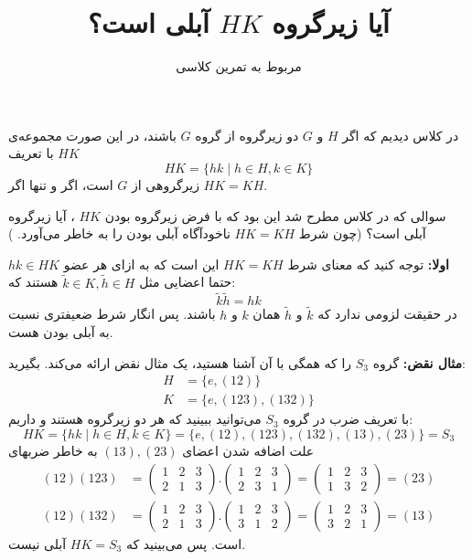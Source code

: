 \documentclass[a4paper, 12pt]{article}
\title{\textbf{
آیا زیرگروه $HK$ آبلی است؟
}}
\author{مربوط به تمرین کلاسی}
\date{}
\begin{document}
\maketitle
در کلاس دیدیم که اگر 
$H$ و $G$ 
دو زیرگروه از گروه $G$ باشند، در این صورت مجموعه‌ی 
$HK$
با تعریف 
\[
HK = \{hk \;\big|\; h\in H , k\in K\}
\]
زیرگروهی از $G$ است، اگر و تنها اگر $HK = KH$.

سوالی که در کلاس مطرح شد این بود که با فرض زیرگروه بودن 
$HK$
‌، آیا زیرگروه آبلی است؟ (چون شرط 
$HK=KH$
ناخودآگاه آبلی بودن را به خاطر می‌آورد.
)

\vspace{1.5em}
\textbf{اولا:}
توجه کنید که معنای شرط 
$HK=KH$
این است که به ازای هر عضو 
$hk \in HK$
حتما اعضایی مثل 
$\tilde{k} \in K , \tilde{h}\in H$
هستند که:
\[
\tilde{k}\tilde{h} = hk
\]
‌‌در حقیقت لزومی ندارد که 
$\tilde{k}$
و 
$\tilde{h}$
همان 
$k$ و $h$ 
باشند. پس انگار شرط ضعیفتری نسبت به آبلی بودن هست.

\vspace{1.5 em}
\textbf{مثال نقض:}
گروه 
$S_3$
را که همگی با آن آشنا هستید، یک مثال نقض ارائه می‌کند. بگیرید:
\begin{equation*}
	\begin{aligned}
		H &= \{e , (12)\} \\
		K &= \{e, (123), (132)\}
	\end{aligned}
\end{equation*}
با تعریف ضرب در گروه $S_3$ می‌توانید ببینید که هر دو زیرگروه هستند و داریم:
\[
HK = \{hk \; \big| \; h\in H , k\in K\} = \{e, (12),(123),(132),(13),(23)\} = S_3
\]
علت اضافه شدن اعضای 
$(13),(23)$
به خاطر ضربهای 
\begin{equation*}
	\begin{aligned}
		(12)(123) &=
		\begin{pmatrix}
			1 & 2 & 3 \\
			2 & 1 & 3
		\end{pmatrix}.
		\begin{pmatrix}
		 	1 & 2 & 3 \\
		 	2 & 3 & 1
		 \end{pmatrix} = 
		 \begin{pmatrix}
		 	1 & 2 & 3 \\
		 	1 & 3 & 2 
		 \end{pmatrix} = 
		 (23)\\
		(12)(132) &=
		\begin{pmatrix}
			1 & 2 & 3 \\
			2 & 1 & 3
		\end{pmatrix}.
		\begin{pmatrix}
			1 & 2 & 3 \\
			3 & 1 & 2
		\end{pmatrix} = 
		\begin{pmatrix}
			1 & 2 & 3 \\
			3 & 2 & 1 
		\end{pmatrix} = 
		 (13)
	\end{aligned}
\end{equation*}
است.
پس می‌بینید که 
$HK = S_3$
آبلی نیست.
\end{document}
